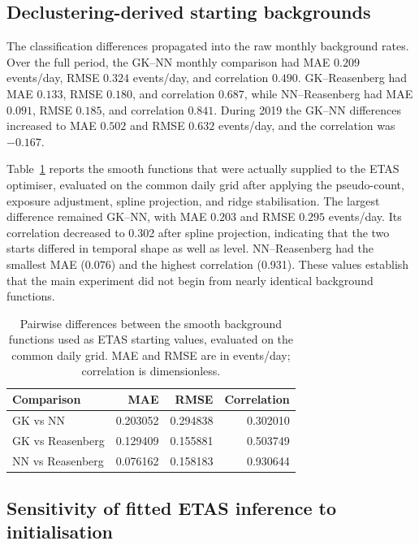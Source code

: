 \subsection{Declustering-derived starting backgrounds}
\label{sec:results_initialisation}

The classification differences propagated into the raw monthly background
rates. Over the full period, the GK--NN monthly comparison had MAE $0.209$
events/day, RMSE $0.324$ events/day, and correlation $0.490$. GK--Reasenberg
had MAE $0.133$, RMSE $0.180$, and correlation $0.687$, while NN--Reasenberg
had MAE $0.091$, RMSE $0.185$, and correlation $0.841$. During 2019 the
GK--NN differences increased to MAE $0.502$ and RMSE $0.632$ events/day, and
the correlation was $-0.167$.

Table~\ref{tab:initial_background_metrics} reports the smooth functions that
were actually supplied to the ETAS optimiser, evaluated on the common daily
grid after applying the pseudo-count, exposure adjustment, spline projection,
and ridge stabilisation. The largest difference remained GK--NN, with MAE
$0.203$ and RMSE $0.295$ events/day. Its correlation decreased to 0.302 after
spline projection, indicating that the two starts differed in temporal shape
as well as level. NN--Reasenberg had the smallest MAE ($0.076$) and the
highest correlation (0.931). These values establish that the main experiment
did not begin from nearly identical background functions.

\begin{table}[htbp]
\centering
\caption{Pairwise differences between the smooth background functions used as
ETAS starting values, evaluated on the common daily grid. MAE and RMSE are in
events/day; correlation is dimensionless.}
\label{tab:initial_background_metrics}
\begin{tabular}{lrrr}
\toprule
Comparison & MAE & RMSE & Correlation \\
\midrule
GK vs NN & 0.203052 & 0.294838 & 0.302010 \\
GK vs Reasenberg & 0.129409 & 0.155881 & 0.503749 \\
NN vs Reasenberg & 0.076162 & 0.158183 & 0.930644 \\
\bottomrule
\end{tabular}
\end{table}

\subsection{Sensitivity of fitted ETAS inference to initialisation}
\label{sec:results_etas}

